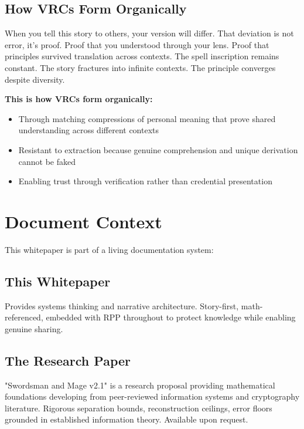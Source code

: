 \documentclass[11pt,a4paper]{article}
\theoremstyle{definition}
\begin{document}
\subsection{How VRCs Form Organically}

When you tell this story to others, your version will differ. That deviation is not error, it's proof. Proof that you understood through your lens. Proof that principles survived translation across contexts. The spell inscription remains constant. The story fractures into infinite contexts. The principle converges despite diversity.

\textbf{This is how VRCs form organically:}

\begin{itemize}
    \item Through matching compressions of personal meaning that prove shared understanding across different contexts
    \item Resistant to extraction because genuine comprehension and unique derivation cannot be faked
    \item Enabling trust through verification rather than credential presentation
\end{itemize}

\section{Document Context}

This whitepaper is part of a living documentation system:

\subsection{This Whitepaper}

Provides systems thinking and narrative architecture. Story-first, math-referenced, embedded with RPP throughout to protect knowledge while enabling genuine sharing.

\subsection{The Research Paper}

"Swordsman and Mage v2.1" is a research proposal providing mathematical foundations developing from peer-reviewed information systems and cryptography literature. Rigorous separation bounds, reconstruction ceilings, error floors grounded in established information theory. Available upon request.
\end{document}
